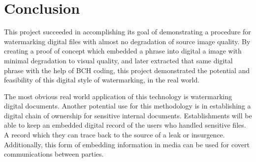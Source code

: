 \section{Conclusion}\label{sec:conc}
This project succeeded in accomplishing its goal of demonstrating a procedure for watermarking digital files with almost no degradation of source image quality.
By creating a proof of concept which embedded a phrase into digital a image with minimal degradation to visual quality, and later extracted that same digital phrase with the help of BCH coding, this project demonstrated the potential and feasibility of this digital style of watermarking, in the real world.

The most obvious real world application of this technology is watermarking digital documents.
Another potential use for this methodology is in establishing a digital chain of ownership for sensitive internal documents.
Establishments will be able to keep an embedded digital record of the users who handled sensitive files. 
A record which they can trace back to the source of a leak or insurgence. Additionally, this form of embedding information in media can be used for covert communications between parties.
